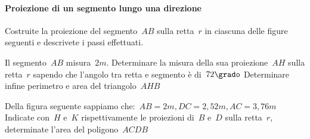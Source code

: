 \paragraph{Proiezione di un segmento lungo una direzione}

\begin{esercizio}
\label{ese:G.11}
Costruite la proiezione del segmento~\(AB\) sulla retta~\(r\) in ciascuna delle 
figure seguenti e descrivete i passi effettuati.
\begin{center}
\begin {inaccessibleblock}
 
\end {inaccessibleblock}
\end{center}
\end{esercizio}

\begin{multicols}{2}
 \begin{esercizio}
\label{ese:G.12}
Il segmento~\(AB\) misura~\(2\unit{m}\). Determinare la 
misura della sua proiezione~\(AH\) sulla retta~\(r\) sapendo che l'angolo tra retta 
e segmento è di~\(72\grado\) Determinare infine perimetro e area del 
triangolo~\(AHB\)
\begin{center}
 
\end{center}
\end{esercizio}

\begin{esercizio}
\label{ese:G.13}
Della figura seguente sappiamo 
che:~\({AB}=2\unit{m}\),\,\({DC}=2,52\unit{m}\),\,\({AC}=3,76\unit{m}\)
Indicate con~\(H\) e~\(K\) rispettivamente le proiezioni di~\(B\) e~\(D\) sulla 
retta~\(r\), determinate l'area del poligono~\(ACDB\)
\begin{center}
 
\end{center}
\end{esercizio}
\end{multicols}

%  
%  
%  

